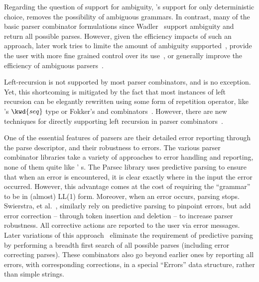 Regarding the question of support for ambiguity, \ddc{}'s support for only deterministic choice, removes the possibility of ambiguous grammars. In contrast, many of the basic parser combinator formulations since Wadler~\cite{wadler:failure-successes} support ambiguity and return all possible parses. However, given the efficiency impacts of such an approach, later work tries to limite the amount of ambiguity supported~\cite{swierstra+:deterministic-error-correcting,leijen+:parsec}, provide the user with more fine grained control over its use~\cite{hughes+:polish-parsing}, or generally improve the efficiency of ambiguous parsers~\cite{peake+:earley-cps,frost+:padl-pcombs}.

Left-recursion is not supported by most parser combinators, and \ddc{} is no exception. Yet, this shortcoming is mitigated by the fact that most instances of left recursion can be elegantly rewritten using some form of repetition operator, like \ddc{}'s $\kwd{seq}$ type or
Fokker's  and  combinators~\cite{fokker:functional-parsers}. However, there are new techniques for directly supporting left recursion in parser combinators~\cite{frost+:padl-pcombs}.

One of the essential features of \ddc{} parsers are their detailed error reporting through the parse descriptor, and their robustness to errors. The various parser combinator libraries take a variety of approaches to error handling and reporting, none of them quite like \ddc{}'
s. The Parsec library uses predictive parsing to ensure that when an error is encountered, it is clear exactly where in the input the error occurred. However, this advantage comes at the cost of requiring the ``grammar'' to be in (almost) LL(1) form. Moreover, when an error occurs, parsing stops. Swierstra, et al.~\cite{swierstra+:deterministic-error-correcting}, similarly rely on predictive parsing to pinpoint errors, but add error correction -- through token insertion and deletion -- to increase parser robustness. All corrective actions are reported to the user via error messages. Later variations of this approach~\cite{swierstra+:fast-error-correcting,swierstra:toys-parsing} eliminate the requirement of predictive parsing by performing a breadth first search of all possible parses (including error correcting parses). These combinators also go beyond earlier ones by reporting all errors, with corresponding corrections, in a special ``Errors'' data structure, rather than simple strings.


